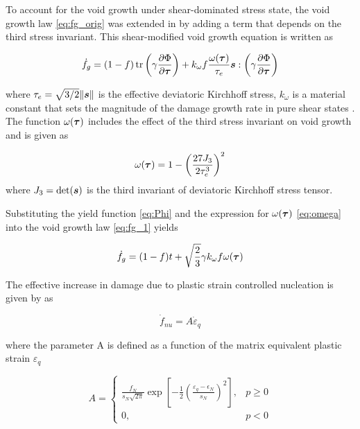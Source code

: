 To account for the void growth under shear-dominated stress state, the void growth law \eqref{eq:fg_orig} was extended in \cite{Nahshon2008} by adding a term that depends on the third stress invariant. This shear-modified void growth equation is written as

\begin{equation}\label{eq:fg_1}
\dot{f}_g = (1-f)\operatorname{\text{tr}}\left( \gamma\frac{\partial\Phi}{\partial{\boldsymbol{\tau}}} \right) + k_{\omega}f\frac{\omega({\boldsymbol{\tau}})}{\tau_e}{\boldsymbol{s}}: \left( \gamma\frac{\partial\Phi}{\partial{\boldsymbol{\tau}}} \right)
\end{equation}

where $\tau_e=\sqrt{3/2}\|{\boldsymbol{s}}\|$ is the effective deviatoric Kirchhoff stress, $k_{\omega}$ is a material constant that sets the magnitude of the damage growth rate in pure shear states \cite{Nahshon2008}. The function $\omega({\boldsymbol{\tau}})$ includes the effect of the third stress invariant on void growth and is given as

\begin{equation}\label{eq:omega}
\omega({\boldsymbol{\tau}}) = 1- \left(\frac{27J_3}{2\tau_e^3}\right)^2
\end{equation}
where $J_3=\det({\boldsymbol{s}})$ is the third invariant of deviatoric Kirchhoff stress tensor.

Substituting the yield function \eqref{eq:Phi} and the expression for $\omega({\boldsymbol{\tau}})$ \eqref{eq:omega} into the void growth law \eqref{eq:fg_1} yields

\begin{equation}\label{eq:fg_final}
\dot{f}_g = (1-f)t + \sqrt{\frac{2}{3}}\gamma k_{\omega}f \omega({\boldsymbol{\tau}})
\end{equation}

The effective increase in damage due to plastic strain controlled nucleation is given by \cite{Chu1980} as

\begin{equation}\label{eq:dotf_nu}
\dot{f}_{nu} = A \dot{\varepsilon}_q
\end{equation}

where the parameter A is defined as a function of the matrix equivalent plastic strain $\varepsilon_q$

\begin{equation}
A = 
   \begin{cases}
     \frac{f_N}{s_N\sqrt{2\pi}}\exp\left[ -\frac{1}{2}\left( \frac{\varepsilon_q - \epsilon_N}{s_N}\right)^2\right], & p \geq 0\\
	 0,	  & p <0
	\end{cases}
\end{equation}

